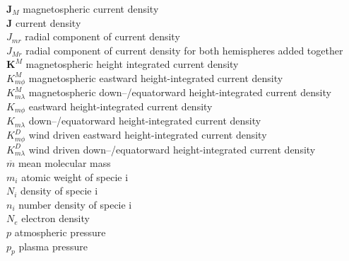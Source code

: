 \begin{tabbing}
\>$\mathbf J_{M}$       \>  magnetospheric current density   \\

\>$\mathbf J$        	\>  current density   \\

\>$J_{mr}$        	\>  radial component of current density   \\

\>$J_{Mr}$        	\>  radial component of current density for both hemispheres added together  \\

\>$\mathbf K^{M}$       \>  magnetospheric height integrated current density   \\

\>$K_{m\phi}^{M}$       \>  magnetospheric eastward height-integrated current density   \\

\>$K_{m\lambda}^{M}$    \>  magnetospheric down--/equatorward height-integrated current density   \\

\>$K_{m\phi}$        	\>  eastward height-integrated current density   \\

\>$K_{m\lambda}$        \>  down--/equatorward height-integrated current density   \\

\>$K_{m\phi}^D$        	\>  wind driven eastward height-integrated current density   \\

\>$K_{m\lambda}^D$      \>  wind driven down--/equatorward height-integrated current density   \\

\>$\overline{m}$        \>  mean molecular mass  \\

\>$m_i$        		\>  atomic weight of specie i   \\

\>$N_i$        		\>  density of specie i   \\

\>$n_i$        		\>  number density of specie i   \\

\>$N_e$        		\>  electron density   \\

\>$p$        		\>  atmospheric pressure   \\

\>$p_p$        		\>  plasma pressure   \\


\end{tabbing}

